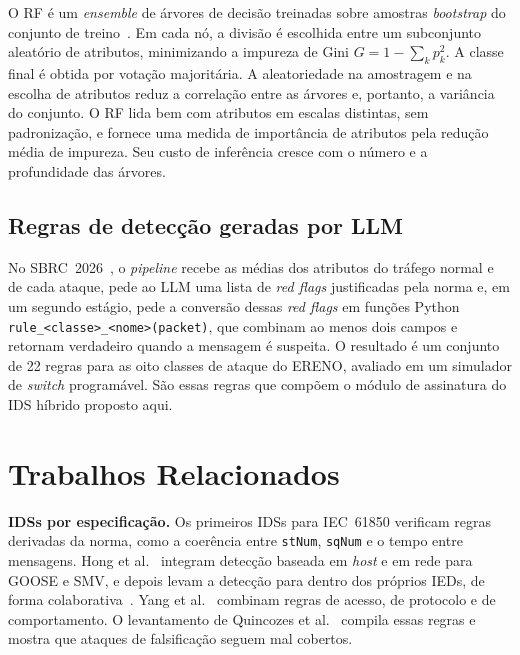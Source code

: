 \documentclass[12pt]{article}
\begin{document}
O RF é um \textit{ensemble} de árvores de decisão treinadas sobre amostras
\textit{bootstrap} do conjunto de treino~\cite{breiman2001random}. Em cada nó, a
divisão é escolhida entre um subconjunto aleatório de atributos, minimizando a
impureza de Gini $G = 1 - \sum_k p_k^2$. A classe final é obtida por votação
majoritária. A aleatoriedade na amostragem e na escolha de atributos reduz a
correlação entre as árvores e, portanto, a variância do conjunto. O RF lida bem
com atributos em escalas distintas, sem padronização, e fornece uma medida de
importância de atributos pela redução média de impureza. Seu custo de
inferência cresce com o número e a profundidade das árvores.

\subsection{Regras de detecção geradas por LLM}

No SBRC~2026~\cite{martins2026redflags}, o \textit{pipeline} recebe as médias
dos atributos do tráfego normal e de cada ataque, pede ao LLM uma lista de
\textit{red flags} justificadas pela norma e, em um segundo estágio, pede a
conversão dessas \textit{red flags} em funções Python
\texttt{rule\_<classe>\_<nome>(packet)}, que combinam ao menos dois campos e
retornam verdadeiro quando a mensagem é suspeita. O resultado é um conjunto de
22 regras para as oito classes de ataque do ERENO, avaliado em um simulador de
\textit{switch} programável. São essas regras que compõem o módulo de
assinatura do IDS híbrido proposto aqui.

\section{Trabalhos Relacionados}\label{sec:rel}

\textbf{IDSs por especificação.} Os primeiros IDSs para IEC~61850 verificam
regras derivadas da norma, como a coerência entre \texttt{stNum},
\texttt{sqNum} e o tempo entre mensagens.
Hong et al.~\cite{hong2014integrated} integram detecção baseada em
\textit{host} e em rede para GOOSE e SMV, e depois levam a detecção para dentro
dos próprios IEDs, de forma colaborativa~\cite{hong2019ieds}.
Yang et al.~\cite{yang2017multidimensional} combinam regras de acesso, de
protocolo e de comportamento. O levantamento de Quincozes et
al.~\cite{quincozes2021survey} compila essas regras e mostra que ataques de
falsificação seguem mal cobertos.
\end{document}
